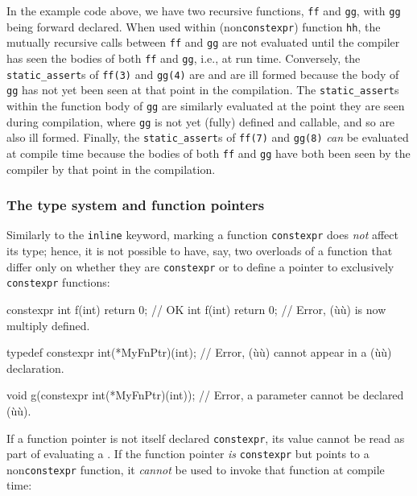 \noindent In the example code above, we have two recursive functions, \lstinline!ff!
and \lstinline!gg!, with \lstinline!gg! being forward declared. When used
within (non\lstinline!constexpr!) function \lstinline!hh!, the mutually
recursive calls between \lstinline!ff! and \lstinline!gg! are not evaluated
until the compiler has seen the bodies of both \lstinline!ff! and
\lstinline!gg!, i.e., at run time. Conversely, the \lstinline!static_assert!s
of \lstinline!ff(3)! and \lstinline!gg(4)! are  and are ill formed because the body of \lstinline!gg! has not yet
been seen at that point in the compilation. The \lstinline!static_assert!s
within the function body of \lstinline!gg! are similarly evaluated at the
point they are seen during compilation, where \lstinline!gg! is not yet
(fully) defined and callable, and so are also ill formed. Finally, the
\lstinline!static_assert!s of \lstinline!ff(7)! and \lstinline!gg(8)! \emph{can}
be evaluated at compile time because the bodies of both \lstinline!ff! and
\lstinline!gg! have both been seen by the compiler by that point in the
compilation.

\subsubsection[The type system and function pointers]{The type system and function pointers}\label{the-type-system-and-function-pointers}

Similarly to the \lstinline!inline! keyword, marking a function
\lstinline!constexpr! does \emph{not} affect its type; hence, it is not
possible to have, say, two overloads of a function that differ only on
whether they are \lstinline!constexpr! or to define a pointer to
exclusively \lstinline!constexpr! functions:

\begin{emcppslisting}
constexpr int f(int) { return 0; }  // OK
int f(int)           { return 0; }  // Error, (ù{}ù) is now multiply defined.

typedef constexpr int(*MyFnPtr)(int);
    // Error, (ù{}ù) cannot appear in a (ù{}ù) declaration.

void g(constexpr int(*MyFnPtr)(int));
    // Error, a parameter cannot be declared (ù{}ù).
\end{emcppslisting}
    

\noindent If a function pointer is not itself declared \lstinline!constexpr!, its
value cannot be read as part of evaluating a . If the function pointer \emph{is} \lstinline!constexpr! but
points to a non\lstinline!constexpr! function, it \emph{cannot} be used to
invoke that function at compile time:

